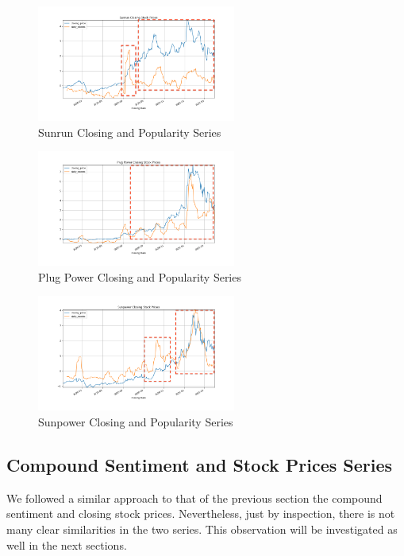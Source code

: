 \documentclass[sigconf, nonacm]{acmart}
\begin{document}
\begin{figure}[H]
  \centering
  \includegraphics[width=\linewidth, height =1.5in]{popularity_time_series/Sunrun Closing Stock Prices_closing_price_daily_tweets.png}
  \caption{Sunrun Closing and Popularity Series}
  \label{Sunrun Closing Stock Prices_closing_price_daily_tweets}
\end{figure}

\begin{figure}[H]
  \centering
  \includegraphics[width=\linewidth, height =1.5in]{popularity_time_series/Plug Power Closing Stock Prices_closing_price_daily_tweets.png}
  \caption{Plug Power Closing and Popularity Series}
  \label{Plug Power Closing Stock Prices_closing_price_daily_tweets}
\end{figure}

\begin{figure}[H]
  \centering
  \includegraphics[width=\linewidth, height =1.5in]{popularity_time_series/Sunpower Closing Stock Prices_closing_price_daily_tweets.png}
  \caption{Sunpower Closing and Popularity Series}
  \label{Sunpower Closing Stock Prices_closing_price_daily_tweets}
\end{figure}


\subsection{Compound Sentiment and Stock Prices Series} 
We followed a similar approach to that of the previous section the compound sentiment and closing stock prices. Nevertheless,  just by inspection, there is not many clear similarities in the two series. This observation will be investigated as well in the next sections.
\end{document}
